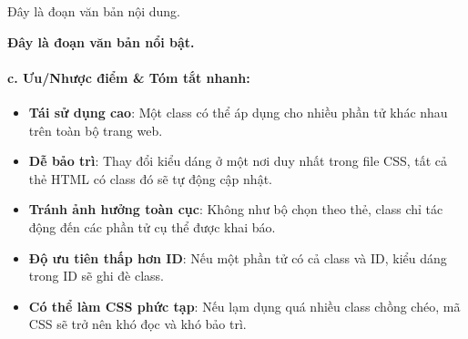 \begin{browserWindow}
\sffamily\small
{} \par\vspace{4pt}
\flushleft
\textcolor{darkText}{Đây là đoạn văn bản nội dung.} \par\vspace{2pt}
\colorbox{yellow!80}{\textcolor{darkText}{\textbf{Đây là đoạn văn bản nổi bật.}}} \par\vspace{4pt}
\end{browserWindow}

\paragraph{c. Ưu/Nhược điểm \& Tóm tắt nhanh:}

\begin{tipBox}
\begin{itemize}[leftmargin=1.5em, itemsep=2pt, parsep=0pt]
    \item \textbf{Tái sử dụng cao}: Một class có thể áp dụng cho nhiều phần tử khác nhau trên toàn bộ trang web.
    \item \textbf{Dễ bảo trì}: Thay đổi kiểu dáng ở một nơi duy nhất trong file CSS, tất cả thẻ HTML có class đó sẽ tự động cập nhật.
    \item \textbf{Tránh ảnh hưởng toàn cục}: Không như bộ chọn theo thẻ, class chỉ tác động đến các phần tử cụ thể được khai báo.
\end{itemize}
\end{tipBox}

\begin{warnBox}
\begin{itemize}[leftmargin=1.5em, itemsep=2pt, parsep=0pt]
    \item \textbf{Độ ưu tiên thấp hơn ID}: Nếu một phần tử có cả class và ID, kiểu dáng trong ID sẽ ghi đè class.
    \item \textbf{Có thể làm CSS phức tạp}: Nếu lạm dụng quá nhiều class chồng chéo, mã CSS sẽ trở nên khó đọc và khó bảo trì.
\end{itemize}
\end{warnBox}

